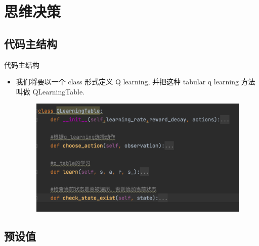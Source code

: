 \documentclass{beamer}
\begin{document}
\section{思维决策}
\subsection{代码主结构}

\begin{frame}{代码主结构}
    \begin{itemize}
    \tiny
    \item 我们将要以一个 class 形式定义 Q learning, 并把这种 tabular q learning 方法叫做 QLearningTable.
    \begin{minipage}{0.5\linewidth}
        \medskip
        \begin{figure}[h]
            \centering
            \includegraphics[height=.4\textheight]{pic/6.png}
        \end{figure}
    \end{minipage}
    \end{itemize}
\end{frame}


\subsection{预设值}
\end{document}
